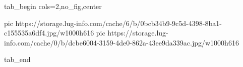  
 
 
 
 

\ifcmt
  tab_begin cols=2,no_fig,center

     pic https://storage.lug-info.com/cache/6/b/0bcb34b9-9c5d-4398-8ba1-c155535a6df4.jpg/w1000h616
		 pic https://storage.lug-info.com/cache/0/b/dcbe6004-3159-4de0-862a-43ee9da339ac.jpg/w1000h616

  tab_end
\fi
